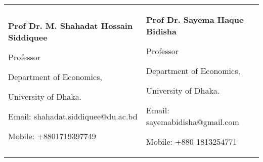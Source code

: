 

\begin{tabularx}{\textwidth}{@{}X X@{}}
\textbf{Prof Dr. M. Shahadat Hossain Siddiquee}\par
Professor\par
Department of Economics, \par 
University of Dhaka.\par 
Email: shahadat.siddiquee@du.ac.bd \par 
Mobile: +8801719397749 \par 

& 

\textbf{Prof Dr. Sayema Haque Bidisha }\par
Professor\par
Department of Economics, \par 
University of Dhaka.\par 
Email: sayemabidisha@gmail.com \par 
Mobile: +880 1813254771 \par 
\\
\end{tabularx}
